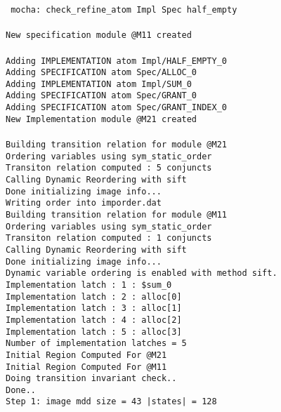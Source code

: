\mypar
\noindent
{\tt
mocha: check\_refine\_atom  Impl Spec half\_empty  \\
\\
New specification module @M11 created \\
\\
Adding IMPLEMENTATION atom Impl/HALF\_EMPTY\_0 \\
Adding SPECIFICATION  atom Spec/ALLOC\_0 \\
Adding IMPLEMENTATION atom Impl/SUM\_0 \\
Adding SPECIFICATION  atom Spec/GRANT\_0 \\
Adding SPECIFICATION  atom Spec/GRANT\_INDEX\_0 \\
New Implementation module @M21 created \\
\\
Building transition relation for module @M21 \\
Ordering variables using sym\_static\_order \\
Transiton relation computed : 5 conjuncts \\
Calling Dynamic Reordering with sift \\
Done initializing image info... \\
Writing order into imporder.dat \\
Building transition relation for module @M11 \\
Ordering variables using sym\_static\_order \\
Transiton relation computed : 1 conjuncts \\
Calling Dynamic Reordering with sift \\
Done initializing image info... \\
Dynamic variable ordering is enabled with method sift. \\
Implementation latch : 1 : \$sum\_0 \\
Implementation latch : 2 : alloc[0] \\
Implementation latch : 3 : alloc[1] \\
Implementation latch : 4 : alloc[2] \\
Implementation latch : 5 : alloc[3] \\
Number of implementation latches = 5 \\
Initial Region Computed For @M21 \\
Initial Region Computed For @M11 \\
Doing transition invariant check.. \\
Done.. \\
Step 1: image mdd size =         43	 |states| =      128	 \\
}
